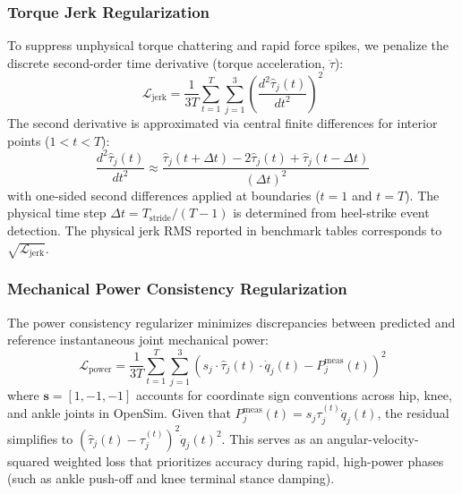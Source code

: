 \documentclass[fleqn,10pt]{wlscirep}
\newcommand{\dotq}{\dot{q}}
\begin{document}
\subsubsection{Torque Jerk Regularization}
To suppress unphysical torque chattering and rapid force spikes, we penalize the discrete second-order time derivative (torque acceleration, $\ddot{\tau}$)\cite{baud2021review}:
\begin{equation}
\mathcal{L}_{\mathrm{jerk}} = \frac{1}{3T} \sum_{t=1}^{T} \sum_{j=1}^{3} \left( \frac{d^2 \hat{\tau}_j(t)}{dt^2} \right)^2
\label{eq:loss_jerk}
\end{equation}
The second derivative is approximated via central finite differences for interior points ($1 < t < T$):
\begin{equation}
\frac{d^2 \hat{\tau}_j(t)}{dt^2} \approx \frac{\hat{\tau}_j(t+\Delta t) - 2\hat{\tau}_j(t) + \hat{\tau}_j(t-\Delta t)}{(\Delta t)^2}
\label{eq:finite_diff}
\end{equation}
with one-sided second differences applied at boundaries ($t=1$ and $t=T$). The physical time step $\Delta t = T_{\mathrm{stride}} / (T - 1)$ is determined from heel-strike event detection\cite{zeni2008two}. The physical jerk RMS reported in benchmark tables corresponds to $\sqrt{\mathcal{L}_{\mathrm{jerk}}}$.

\subsubsection{Mechanical Power Consistency Regularization}
The power consistency regularizer minimizes discrepancies between predicted and reference instantaneous joint mechanical power:
\begin{equation}
\mathcal{L}_{\mathrm{power}} = \frac{1}{3T} \sum_{t=1}^{T} \sum_{j=1}^{3} \left( s_j \cdot \hat{\tau}_j(t) \cdot \dotq_j(t) - P_j^{\mathrm{meas}}(t) \right)^2
\label{eq:loss_power}
\end{equation}
where $\mathbf{s} = [1, -1, -1]$ accounts for coordinate sign conventions across hip, knee, and ankle joints in OpenSim. Given that $P_j^{\mathrm{meas}}(t) = s_j \tau_j^(t) \dotq_j(t)$, the residual simplifies to $(\hat{\tau}_j(t) - \tau_j^(t))^2 \dotq_j(t)^2$. This serves as an angular-velocity-squared weighted loss that prioritizes accuracy during rapid, high-power phases (such as ankle push-off and knee terminal stance damping)\cite{winter2009biomechanics}.
\end{document}
